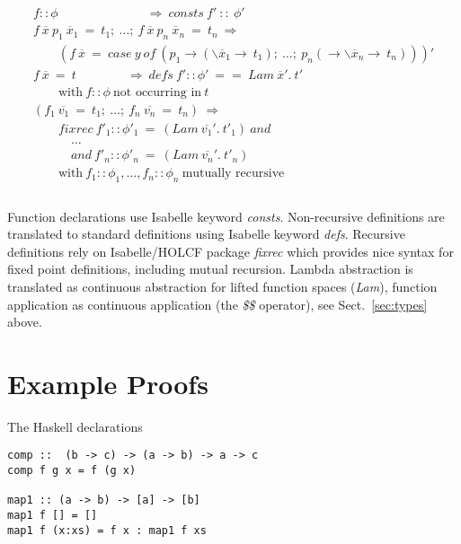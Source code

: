 \documentclass{llncs}
\begin{document}
$$\begin{array}{l}
  f :: \phi \qquad \qquad \qquad \quad \Longrightarrow
  \ consts \ f' \ :: \ \phi' \\
 f \ \overline{x} \ p_1 \ \overline{x}_1 \ = \ t_1; \ 
  \ldots;
  \ f \ \overline{x} \ p_n \ \overline{x}_n \ = \ t_n \ \Longrightarrow \\
  \qquad (f \ \overline{x} \ = \ case \ y \ of \ (p_1 \to (\backslash
  \overline{x}_1 \to \ t_1); \ 
  \ldots; \ p_n (\to \backslash \overline{x}_n \to \ t_n)))' \\
  f \ \overline{x} \ = \ t \qquad \qquad \Longrightarrow \ defs \ f' :: \phi'
  \ 
  == \ Lam \ \overline{x}'. \ t' \\
  \qquad \mbox{with} \ f::\phi \ \mbox{not \ occurring \ in} \ t \\
  (f_1 \ \overline{v_1} \ = \ t_1; \ \ldots;
  \ f_n \ \overline{v_n} \ = \ t_n) \ \Longrightarrow \\
  \qquad fixrec \ f'_1 :: \phi'_1 \ =  
    \ (Lam \ \overline{v_1}'. \ t'_1) \ and \\
  \qquad \quad \ldots \\
  \qquad \quad and \ f'_n :: \phi'_n \ =
  \ (Lam \ \overline{v_n}'. \ t'_n) \\
  \qquad \mbox{with} \ f_1::\phi_1, \ldots, f_n::\phi_n \ 
  \mbox{mutually \ recursive} \\
\end{array}$$\\


Function declarations use Isabelle keyword \emph{consts}. 
%
Non-recursive definitions are translated to standard definitions using
Isabelle keyword \emph{defs}. Recursive definitions rely on
Isabelle/HOLCF package \emph{fixrec} which provides nice syntax for
fixed point definitions, including mutual recursion. Lambda
abstraction is translated as continuous abstraction for lifted
function spaces (\emph{Lam}), function application as continuous
application (the \emph{\$\$} operator), see Sect.~\ref{sec:types}
above.

\section{Example Proofs}
\label{sec:ex}

The Haskell declarations
\begin{verbatim}
comp ::  (b -> c) -> (a -> b) -> a -> c
comp f g x = f (g x)

map1 :: (a -> b) -> [a] -> [b]
map1 f [] = []
map1 f (x:xs) = f x : map1 f xs
\end{verbatim}
\end{document}
